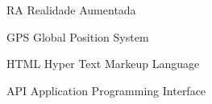 \begin{siglas}
\item [RA] Realidade Aumentada
\item [GPS] Global Position System
\item [HTML] Hyper Text Markeup Language
\item [API] Application Programming Interface
\end{siglas}
